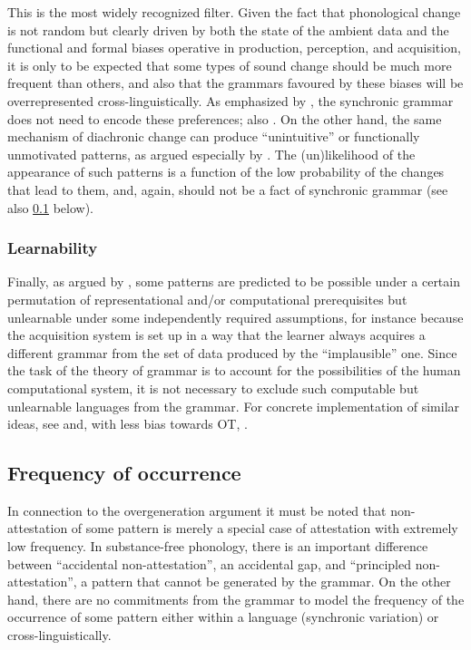This is the most widely recognized filter. Given the fact that phonological change is not random but clearly driven by both the state of the ambient data and the functional and formal biases operative in production, perception, and acquisition, it is only to be expected that some types of sound change should be much more frequent than others, and also that the grammars favoured by these biases will be overrepresented cross\hyp linguistically. As emphasized by \citet{blevins}, the synchronic grammar does not need to encode these preferences; \cf also \citet{kavitskaya02:_compen,barnesbook,reiss07:_modul}. On the other hand, the same mechanism of diachronic change can produce \enquote{unintuitive} or functionally unmotivated patterns, as argued especially by \citet{mielke-diss,yu07}. The (un)likelihood of the appearance of such patterns is a function of the low probability of the changes that lead to them, and, again, should not be a fact of synchronic grammar (see also \cref{sec:frequency-occurrence} below).

\subsubsection{Learnability}
\label{sec:learnability}

Finally, as argued by \citet{reiss07:_modul}, some patterns are predicted to be possible under a certain permutation of representational and\fshyp or computational prerequisites but unlearnable under some independently required assumptions, for instance because the acquisition system is set up in a way that the learner always acquires a different grammar from the set of data produced by the \enquote{implausible} one.  Since the task of the theory of grammar is to account for the possibilities of the human computational system, it is not necessary to exclude such computable but unlearnable languages from the grammar. For concrete implementation of similar ideas, see \citet{Alderete20081177} and, with less bias towards OT, \citet{Heinz-2009-RLLSP}.

\subsection{Frequency of occurrence}
\label{sec:frequency-occurrence}

In connection to the overgeneration argument it must be noted that non\hyp attestation of some pattern is merely a special case of attestation with extremely low frequency. In substance\hyp free phonology, there is an important difference between \enquote{accidental non\hyp attestation}, \ie an accidental gap, and \enquote{principled non\hyp attestation}, \ie a pattern that cannot be generated by the grammar. On the other hand, there are no commitments from the grammar to model the frequency of the occurrence of some pattern either within a language (synchronic variation) or cross\hyp linguistically.

